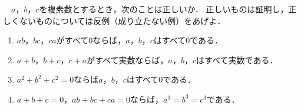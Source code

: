 \begin{problem}
  　$a$，$b$，$c$を複素数とするとき，次のことは正しいか．
正しいものは証明し，正しくないものについては反例（成り立たない例）をあげよ．
\begin{enumerate}
\item $ab$，$bc$，$ca$がすべて0ならば，$a$，$b$，$c$はすべて0である．
\item $a+b$，$b+c$，$c+a$がすべて実数ならば，$a$，$b$，$c$はすべて実数である．
\item $a^2+b^2+c^2=0$ならば$a$，$b$，$c$はすべて0である．
\item $a+b+c=0$，$ab+bc+ca=0$ならば，$a^3=b^3=c^3$である．
\end{enumerate}
\end{problem}
